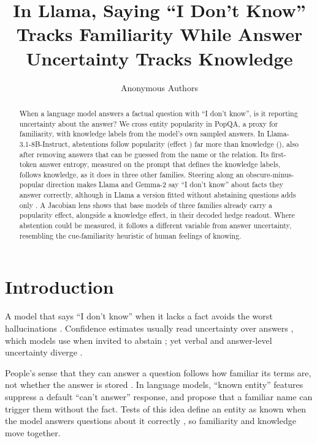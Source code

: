 \documentclass{article}
\title{In Llama, Saying ``I Don't Know'' \\Tracks Familiarity While Answer\\Uncertainty Tracks Knowledge}
\author{Anonymous Authors}
\newcommand{\idk}{``I don't know''}
\begin{document}
\maketitle

\begin{abstract}
When a language model answers a factual question with \idk, is it reporting uncertainty about the answer? We cross entity popularity in PopQA, a proxy for familiarity, with knowledge labels from the model's own sampled answers. In Llama-3.1-8B-Instruct, abstentions follow popularity (effect \hmLlamaPopEff) far more than knowledge (\hmLlamaKnowEff), also after removing answers that can be guessed from the name or the relation. Its first-token answer entropy, measured on the prompt that defines the knowledge labels, follows knowledge, as it does in three other families. Steering along an obscure-minus-popular direction makes Llama and Gemma-2 say \idk{} about facts they answer correctly, although in Llama a version fitted without abstaining questions adds only \nhOverRand. A Jacobian lens shows that base models of three families already carry a popularity effect, alongside a knowledge effect, in their decoded hedge readout. Where abstention could be measured, it follows a different variable from answer uncertainty, resembling the cue-familiarity heuristic of human feelings of knowing.
\end{abstract}

\section{Introduction}

A model that says \idk{} when it lacks a fact avoids the worst hallucinations \citep{kalai2025hallucinate}. Confidence estimates usually read uncertainty over answers \citep{kadavath2022know,kuhn2023semantic,stolfo2024confidence}, which models use when invited to abstain \citep{kumaran2026confidence}; yet verbal and answer-level uncertainty diverge \citep{ji2025hedging}.

People's sense that they can answer a question follows how familiar its terms are, not whether the answer is stored \citep{reder1992,schwartz1992}. In language models, ``known entity'' features suppress a default ``can't answer'' response, and \citet{lindsey2025biology} propose that a familiar name can trigger them without the fact. Tests of this idea define an entity as known when the model answers questions about it correctly \citep{ferrando2025iknow}, so familiarity and knowledge move together.
\end{document}
